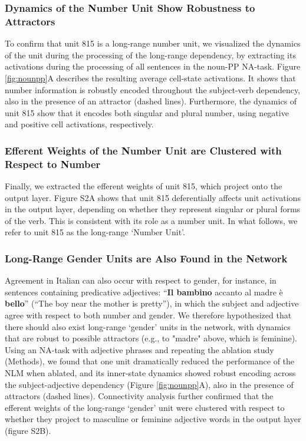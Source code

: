 \subsubsection{Dynamics of the Number Unit Show Robustness to Attractors} 
To confirm that unit 815 is a long-range number unit, we visualized the dynamics of the unit during the processing of the long-range dependency, by extracting its activations during the processing of all sentences in the noun-PP NA-task. Figure \ref{fig:nounpp}A describes the resulting average cell-state activations. It shows that number information is robustly encoded throughout the subject-verb dependency, also in the presence of an attractor (dashed lines). Furthermore, the dynamics of unit 815 show that it encodes both singular and plural number, using negative and positive cell activations, respectively.

\subsubsection{Efferent Weights of the Number Unit are Clustered with Respect to Number}
Finally, we extracted the efferent weights of unit 815, which project onto the output layer. Figure S2A shows that unit 815 deferentially affects unit activations in the output layer, depending on whether they represent singular or plural forms of the verb. This is consistent with its role as a number unit. In what follows, we refer to unit 815 as the long-range `Number Unit'.

\subsubsection{Long-Range Gender Units are Also Found in the Network }
Agreement in Italian can also occur with respect to gender, for instance, in sentences containing predicative adjectives: ``\textbf{Il bambino} accanto al madre \`{e} \textbf{bello}'' (``The boy near the mother is pretty''), in which the subject and adjective agree with respect to both number and gender. We therefore hypothesized that there should also exist long-range `gender' units in the network, with dynamics that are robust to possible attractors (e.g., to "madre" above, which is feminine). Using an NA-task with adjective phrases and repeating the ablation study (Methods), we found that one unit dramatically reduced the performance of the NLM when ablated, and its inner-state dynamics showed robust encoding across the subject-adjective dependency (Figure \ref{fig:nounpp}A), also in the presence of attractors (dashed lines). Connectivity analysis further confirmed that the efferent weights of the long-range `gender' unit were clustered with respect to whether they project to masculine or feminine adjective words in the output layer (figure S2B).

